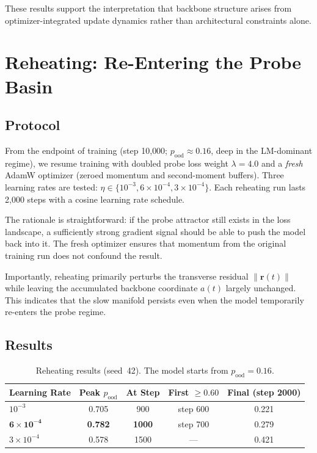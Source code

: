 \documentclass[11pt,a4paper]{article}
\newcommand{\norm}[1]{\lVert #1 \rVert}
\begin{document}
These results support the interpretation that backbone structure arises from
optimizer-integrated update dynamics rather than architectural constraints
alone.


\section{Reheating: Re-Entering the Probe Basin}\label{sec:reheating}

\subsection{Protocol}

From the endpoint of training (step 10{,}000;
$p_{\mathrm{ood}} \approx 0.16$, deep in the LM-dominant regime), we resume
training with doubled probe loss weight $\lambda = 4.0$ and a \emph{fresh}
AdamW optimizer (zeroed momentum and second-moment buffers).  Three learning
rates are tested: $\eta \in \{10^{-3}, 6 \times 10^{-4}, 3 \times 10^{-4}\}$.
Each reheating run lasts 2{,}000 steps with a cosine learning rate schedule.

The rationale is straightforward: if the probe attractor still exists in the
loss landscape, a sufficiently strong gradient signal should be able to push the
model back into it.  The fresh optimizer ensures that momentum from the original
training run does not confound the result.

Importantly, reheating primarily perturbs the transverse residual
$\norm{\mathbf{r}(t)}$ while leaving the accumulated backbone coordinate $a(t)$
largely unchanged.  This indicates that the slow manifold persists even when the
model temporarily re-enters the probe regime.

\subsection{Results}

\begin{table}[t]
\centering
\caption{Reheating results (seed~42).  The model starts from
         $p_{\mathrm{ood}} = 0.16$.}
\label{tab:reheating}
\begin{tabular}{@{}lcccc@{}}
\toprule
\textbf{Learning Rate} & \textbf{Peak $p_{\mathrm{ood}}$} &
\textbf{At Step} & \textbf{First $\ge 0.60$} &
\textbf{Final (step 2000)} \\
\midrule
$10^{-3}$                    & 0.705 & 900  & step 600   & 0.221 \\
$\mathbf{6 \times 10^{-4}}$  & \textbf{0.782} & \textbf{1000} &
    step 700 & 0.279 \\
$3 \times 10^{-4}$           & 0.578 & 1500 & --- & 0.421 \\
\bottomrule
\end{tabular}
\end{table}
\end{document}
